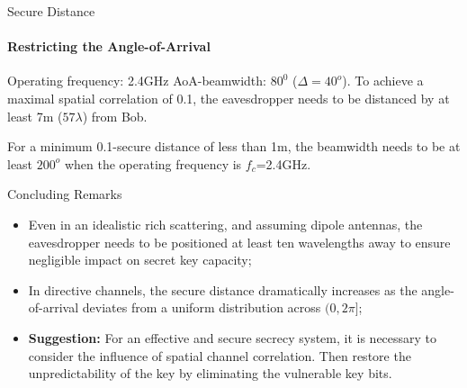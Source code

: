 \begin{frame}{Secure Distance}
\framesubtitle{Restricting the Angle-of-Arrival}
 \begin{example}
Operating frequency: 2.4GHz
{AoA}-beamwidth: $80^0$ ($\Delta =40^o$). To achieve a maximal spatial correlation of 0.1, the eavesdropper needs to be distanced by at least 7m ($57\lambda$) from Bob. 
\end{example}

\begin{example}
For a minimum 0.1-secure distance of less than 1m, the beamwidth needs to be at least $200^o$ when the operating frequency is $f_c$=2.4GHz.
\end{example}
\end{frame}

\begin{frame}{Concluding Remarks}

\begin{itemize}
\item Even in an idealistic rich scattering, and assuming dipole antennas, the eavesdropper needs to be positioned at least ten wavelengths away to ensure negligible impact on secret key capacity;
\item In directive channels, the secure distance dramatically increases as the angle-of-arrival deviates from a uniform distribution across $(0, 2\pi]$;

\item \textbf{Suggestion:} For an effective and secure secrecy system, it is necessary to consider the influence of spatial channel correlation. Then restore the unpredictability of the key by eliminating the vulnerable key bits.

\end{itemize}   
\end{frame}